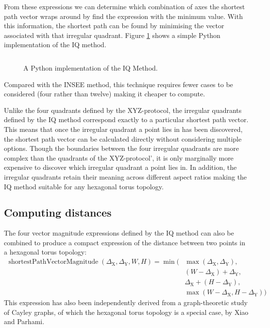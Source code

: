 			From these expressions we can determine which combination of axes the
			shortest path vector wraps around by find the expression with the minimum
			value. With this information, the shortest path can be found by
			minimising the vector associated with that irregular quadrant.  Figure
			\ref{fig:iqmethod.py} shows a simple Python implementation of the IQ
			method.
			
			\begin{figure}
				\inputminted{python}{figures/iqmethod.py}
				
				\caption{A Python implementation of the IQ Method.}
				\label{fig:iqmethod.py}
			\end{figure}
			
			Compared with the INSEE method, this technique requires fewer cases to be
			considered (four rather than twelve) making it cheaper to compute.
			
			Unlike the four quadrants defined by the XYZ-protocol, the irregular
			quadrants defined by the IQ method correspond exactly to a particular
			shortest path vector. This means that once the irregular quadrant a point
			lies in has been discovered, the shortest path vector can be calculated
			directly without considering multiple options. Though the boundaries
			between the four irregular quadrants are more complex than the quadrants
			of the XYZ-protocol', it is only marginally more expensive to discover
			which irregular quadrant a point lies in. In addition, the irregular
			quadrants retain their meaning across different aspect ratios making the
			IQ method suitable for any hexagonal torus topology.
		
		\subsection{Computing distances}
		
			The four vector magnitude expressions defined by the IQ method can also
			be combined to produce a compact expression of the distance between two
			points in a hexagonal torus topology:
			\begin{align*}
				\operatorname{shortestPathVectorMagnitude}(\Delta_\textrm{X}, \Delta_\textrm{Y}, W, H) =
				\operatorname{min}(&\operatorname{max}(\Delta_\textrm{X}, \Delta_\textrm{Y}),\\
				                   &(W - \Delta_\textrm{X}) + \Delta_\textrm{Y},\\
				                   &\Delta_\textrm{X} + (H - \Delta_\textrm{Y}),\\
				                   &\operatorname{max}(W-\Delta_\textrm{X}, H-\Delta_\textrm{Y}))
			\end{align*}
			This expression has also been independently derived from a
			graph-theoretic study of Cayley graphs, of which the hexagonal torus
			topology is a special case, by Xiao and Parhami\cite{xiao04}.
		
